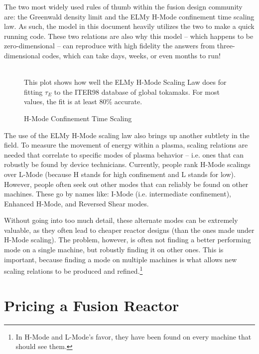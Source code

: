 The two most widely used rules of thumb within the fusion design community are: the Greenwald density limit and the ELMy H-Mode confinement time scaling law. As such, the model in this document heavily utilizes the two to make a quick running code. These two relations are also why this model -- which happens to be zero-dimensional -- can reproduce with high fidelity the answers from three-dimensional codes, which can take days, weeks, or even months to run!

\begin{figure}
	\centering
	\begin{adjustbox}{width=0.75\textwidth}
		
	\end{adjustbox}
	\caption{H-Mode Confinement Time Scaling} ~\\
	\small This plot shows how well the ELMy H-Mode Scaling Law does for fitting $\tau_E$ to the ITER98 database of global tokamaks. For most values, the fit is at least 80\% accurate.
\end{figure}

The use of the ELMy H-Mode scaling law also brings up another subtlety in the field. To measure the movement of energy within a plasma, scaling relations are needed that correlate to specific modes of plasma behavior -- i.e. ones that can robustly be found by device technicians. Currently, people rank H-Mode scalings over L-Mode (because H stands for high confinement and L stands for low). However, people often seek out other modes that can reliably be found on other machines. These go by names like: I-Mode (i.e. intermediate confinement), Enhanced H-Mode, and Reversed Shear modes. \cite{imode,enhanced,shear}

Without going into too much detail, these alternate modes can be extremely valuable, as they often lead to cheaper reactor designs (than the ones made under H-Mode scaling). The problem, however, is often not finding a better performing mode on a single machine, but robustly finding it on other ones. This is important, because finding a mode on multiple machines is what allows new scaling relations to be produced and refined.\footnote{ In H-Mode and L-Mode's favor, they have been found on every machine that should see them. }

\section{Pricing a Fusion Reactor}

